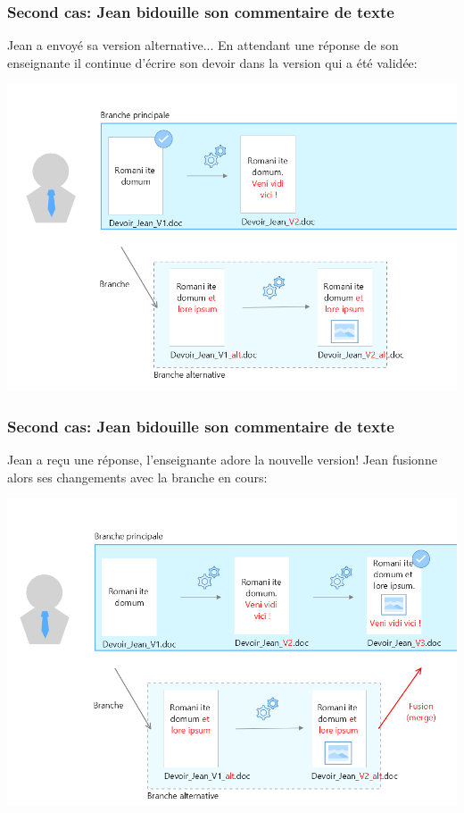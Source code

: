 \documentclass{beamer}
\begin{document}
\begin{frame}
\frametitle{Second cas: Jean bidouille son commentaire de texte}
Jean a envoyé sa version alternative... En attendant une réponse de son enseignante il continue d'écrire son devoir dans la version qui a été validée:
\begin{center}
    \includegraphics[scale=0.25]{images/secondScenario/secondScenario_diapo3.png}
\end{center}
\end{frame}

\begin{frame}
\frametitle{Second cas: Jean bidouille son commentaire de texte}
Jean a reçu une réponse, l'enseignante adore la nouvelle version! Jean fusionne alors ses changements avec la branche en cours:
\begin{center}
    \includegraphics[scale=0.25]{images/secondScenario/secondScenario_diapo4.png}
\end{center}
\end{frame}
\end{document}
